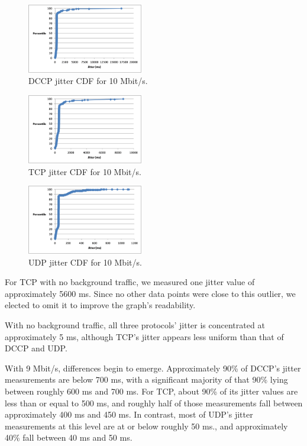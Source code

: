 \begin{figure}[!h]
   \centering
      \includegraphics[width=0.45\textwidth]{pics/dccp_10_jitter_new}
   \caption{DCCP jitter CDF for 10 Mbit/s.}
\label{fig:dccp_10_jitter}
\end{figure}

\begin{figure}[!h]
   \centering
      \includegraphics[width=0.45\textwidth]{pics/tcp_10_jitter}
   \caption{TCP jitter CDF for 10 Mbit/s.}
\label{fig:tcp_10_jitter}
\end{figure}

\begin{figure}[!h]
   \centering
      \includegraphics[width=0.45\textwidth]{pics/udp_10_jitter}
   \caption{UDP jitter CDF for 10 Mbit/s.}
\label{fig:udp_10_jitter}
\end{figure}

For TCP with no background traffic, we measured one jitter value of
approximately 5600 ms. Since no other data points were close to this outlier, we
elected to omit it to improve the graph's readability.

With no background traffic, all three protocols' jitter is concentrated at
approximately 5 ms, although TCP's jitter appears less uniform than that of DCCP
and UDP.

With 9 Mbit/s, differences begin to emerge. Approximately 90\% of DCCP's jitter
measurements are below 700 ms, with a significant majority of that 90\% lying
between roughly 600 ms and 700 ms. For TCP, about 90\% of its jitter values are
less than or equal to 500 ms, and roughly half of those measurements fall
between approximately 400 ms and 450 ms. In contrast, most of UDP's jitter
measurements at this level are at or below roughly 50 ms., and approximately
40\% fall between 40 ms and 50 ms.

